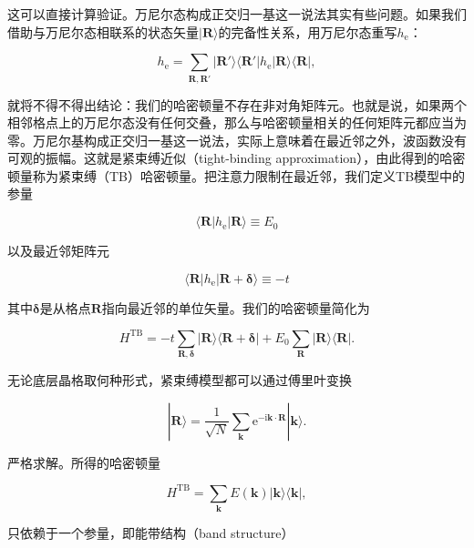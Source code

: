 这可以直接计算验证。万尼尔态构成正交归一基这一说法其实有些问题。如果我们借助与万尼尔态相联系的状态矢量$|\mathbf R\rangle$的完备性关系，用万尼尔态重写$h_{\mathrm e}$：

\begin{equation*}
h_{\mathrm e} = \sum_{\mathbf R,\mathbf R'} |\mathbf R'\rangle\langle \mathbf R'|h_{\mathrm e}|\mathbf R\rangle\langle \mathbf R|,
\tag{3.30}
\end{equation*}

就将不得不得出结论：我们的哈密顿量不存在非对角矩阵元。也就是说，如果两个相邻格点上的万尼尔态没有任何交叠，那么与哈密顿量相关的任何矩阵元都应当为零。万尼尔基构成正交归一基这一说法，实际上意味着在最近邻之外，波函数没有可观的振幅。这就是紧束缚近似（tight-binding approximation），由此得到的哈密顿量称为紧束缚（TB）哈密顿量。把注意力限制在最近邻，我们定义TB模型中的参量

\begin{equation*}
\langle \mathbf R|h_{\mathrm e}|\mathbf R\rangle \equiv E_0
\tag{3.31}
\end{equation*}

以及最近邻矩阵元

\begin{equation*}
\langle \mathbf R|h_{\mathrm e}|\mathbf R+\boldsymbol\delta\rangle \equiv -t
\tag{3.32}
\end{equation*}

其中$\boldsymbol\delta$是从格点$\mathbf R$指向最近邻的单位矢量。我们的哈密顿量简化为

\begin{equation*}
H^{\mathrm{TB}} = -t\sum_{\mathbf R,\boldsymbol\delta} |\mathbf R\rangle\langle \mathbf R+\boldsymbol\delta| + E_0\sum_{\mathbf R} |\mathbf R\rangle\langle \mathbf R|.
\tag{3.33}
\end{equation*}

无论底层晶格取何种形式，紧束缚模型都可以通过傅里叶变换

\begin{equation*}
|\mathbf R\rangle = \frac{1}{\sqrt N}\sum_{\mathbf k} \mathrm e^{-\mathrm i\mathbf k\cdot\mathbf R}|\mathbf k\rangle.
\tag{3.34}
\end{equation*}

严格求解。所得的哈密顿量

\begin{equation*}
H^{\mathrm{TB}} = \sum_{\mathbf k} E(\mathbf k)|\mathbf k\rangle\langle \mathbf k|,
\tag{3.35}
\end{equation*}

只依赖于一个参量，即能带结构（band structure）

